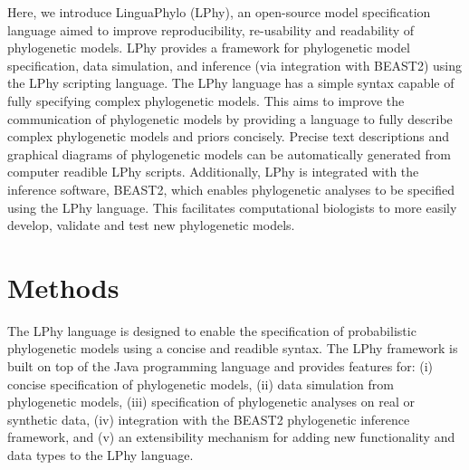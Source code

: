 \documentclass[10pt,letterpaper,table]{article}
\begin{document}
Here, we introduce LinguaPhylo (LPhy), an open-source model specification 
language aimed to improve reproducibility, re-usability and readability of phylogenetic models. 
LPhy provides a framework for phylogenetic model specification, data simulation, and inference (via integration with BEAST2) using the LPhy scripting language. 
The LPhy language has a simple syntax capable of fully specifying complex phylogenetic models. 
This aims to improve the communication of phylogenetic models by providing a language %
to fully describe complex phylogenetic models and priors concisely. 
Precise text descriptions and graphical diagrams of phylogenetic models can be automatically generated from computer readible LPhy scripts.  
Additionally, LPhy is integrated with the inference software, BEAST2, which enables phylogenetic analyses to be specified using the LPhy language. 
This facilitates computational biologists to more easily develop, validate and test new phylogenetic models. 


\section{Methods}
The LPhy language is designed to enable the specification of probabilistic phylogenetic models using a concise and readible syntax.  
The LPhy framework is built on top of the Java programming language and provides features for: 
(i) concise specification of phylogenetic models, (ii) data simulation from phylogenetic models, (iii) specification of phylogenetic analyses on real or synthetic data, (iv) integration with the BEAST2 phylogenetic inference framework, and (v) an extensibility mechanism for adding new functionality and data types to the LPhy language.
 

\end{document}
